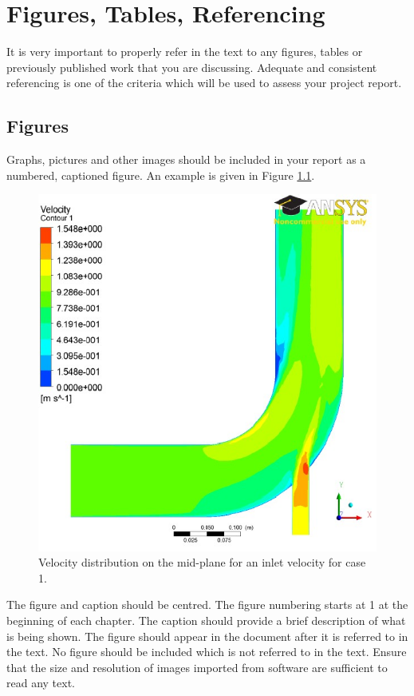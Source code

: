 \chapter{Figures, Tables, Referencing}
It is very important to properly refer in the text to any figures, tables or previously published work that you are discussing. Adequate and consistent referencing is one of the criteria which will be used to assess your project report.

\section{Figures}
Graphs, pictures and other images should be included in your report as a numbered, captioned figure. An example is given in Figure \ref{veldis}.

\begin{figure}[h]
      \centering
      \includegraphics{background/5e1-1.pdf}
      \caption{Velocity distribution on the mid-plane for an inlet velocity for case 1.}
      \label{veldis}
\end{figure}

The figure and caption should be centred. The figure numbering starts at 1 at the beginning of each chapter. The caption should provide a brief description of what is being shown. The figure should appear in the document after it is referred to in the text. No figure should be included which is not referred to in the text. Ensure that the size and resolution of images imported from software are sufficient to read any text.

